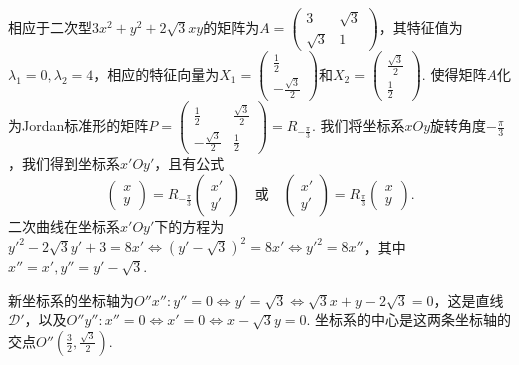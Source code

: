 \begin{solution}
\begin{inparaenum}[(a)]
    \item 相应于二次型$3x^2+y^2+2\sqrt3xy$的矩阵为$A=\begin{pmatrix}
          3 & \sqrt 3 \\
          \sqrt 3 & 1
        \end{pmatrix}$，其特征值为$\lambda_1=0,\lambda_2=4$，相应的特征向量为$X_1=\begin{pmatrix}
          \frac12 \\
          -\frac{\sqrt3}2
        \end{pmatrix}$和$X_2=\begin{pmatrix}
          \frac{\sqrt3}2 \\
          \frac12
        \end{pmatrix}$. 使得矩阵$A$化为Jordan标准形的矩阵$P=\begin{pmatrix}
          \frac12 & \frac{\sqrt3}2 \\
          -\frac{\sqrt3}2 & \frac12
        \end{pmatrix}=R_{-\frac\pi3}$. 我们将坐标系$xOy$旋转角度$-\frac\pi3$，我们得到坐标系$x'Oy'$，且有公式
        \[
          \begin{pmatrix}
            x \\
            y
          \end{pmatrix} =
          R_{-\frac\pi3}
          \begin{pmatrix}
            x' \\
            y'
          \end{pmatrix} \quad
          \text{或} \quad
          \begin{pmatrix}
            x' \\
            y'
          \end{pmatrix} =
          R_{\frac\pi3}
          \begin{pmatrix}
            x \\
            y
          \end{pmatrix}.
        \]
    二次曲线在坐标系$x'Oy'$下的方程为$y'^2-2\sqrt3y'+3=8x'\Leftrightarrow(y'-\sqrt3)^2
    =8x'\Leftrightarrow y'^2=8x''$，其中$x''=x',y''=y'-\sqrt3$.

    新坐标系的坐标轴为$O''x'':y''=0\Leftrightarrow y'=\sqrt3\Leftrightarrow \sqrt3x+y-2\sqrt3=0$，这是直线$\mathscr D'$，以及$O''y'':x''=0\Leftrightarrow x'=0\Leftrightarrow x-\sqrt3y=0$. 坐标系的中心是这两条坐标轴的交点$O''\left(\frac32,\frac{\sqrt3}2\right)$.
  \end{inparaenum}
\end{solution}

